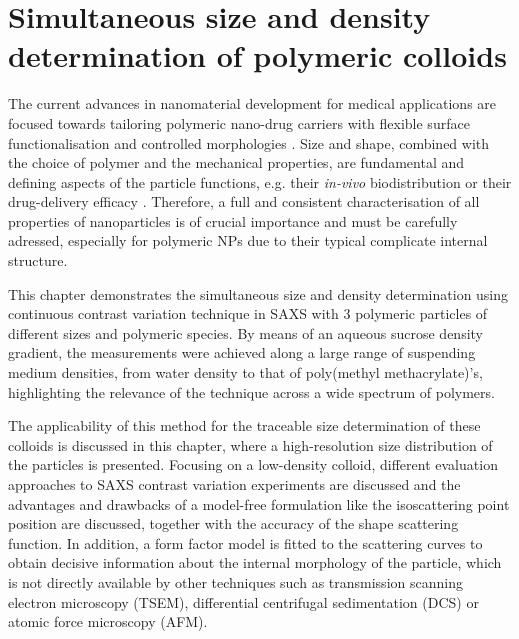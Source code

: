 \chapter{Simultaneous size and density determination of polymeric colloids}
\label{chap:simultaneous_size_density}
The current advances in nanomaterial development for medical applications are focused towards tailoring polymeric nano-drug carriers with flexible surface functionalisation and controlled morphologies \citep{euliss_imparting_2006,yang_shape-memory_2005}. Size and shape, combined with the choice of polymer and the mechanical properties, are fundamental and defining aspects of the particle functions, e.g. their \emph{in-vivo} biodistribution \citep{vittaz_effect_1996,mitragotri_physical_2009,doshi_designer_2009} or their drug-delivery efficacy \citep{powers_research_2006}. Therefore, a full and consistent characterisation of all properties of nanoparticles is of crucial importance and must be carefully adressed, especially for polymeric NPs due to their typical complicate internal structure.

This chapter demonstrates the simultaneous size and density determination using continuous contrast variation technique in SAXS with 3 polymeric particles of different sizes and polymeric species. By means of an aqueous sucrose density gradient, the measurements were achieved along a large range of suspending medium densities, from water density to that of poly(methyl methacrylate)'s, highlighting the relevance of the technique across a wide spectrum of polymers.

The applicability of this method for the traceable size determination of these colloids is discussed in this chapter, where a high-resolution size distribution of the particles is presented. Focusing on a low-density colloid, different evaluation approaches to SAXS contrast variation experiments are discussed and the advantages and drawbacks of a model-free formulation like the isoscattering point position are discussed, together with the accuracy of the shape scattering function. In addition, a form factor model is fitted to the scattering curves to obtain decisive information about the internal morphology of the particle, which is not directly available by other techniques such as transmission scanning electron microscopy (TSEM), differential centrifugal sedimentation (DCS) \citep{fielding_correcting_2012} or atomic force microscopy (AFM). 

